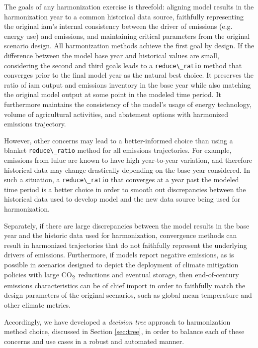 \documentclass[review]{elsarticle}
\newcommand{\code}[1]{\lstinline[basicstyle=\ttfamily\color{black}]|#1|}
\newcommand{\cotwo}{CO\textsubscript{2}~}
\begin{document}
The goals of any harmonization exercise is threefold: aligning model results in
the harmonization year to a common historical data source, faithfully
representing the original \gls{iam}’s internal consistency between the driver
of emissions (e.g. energy use) and emissions, and maintaining critical
parameters from the original scenario design. All harmonization methods achieve
the first goal by design. If the difference between the model base year and
historical values are small, considering the second and third goals leads to a
\code{reduce\_ratio} method that converges prior to the final model year as the
natural best choice. It preserves the ratio of \gls{iam} output and emissions
inventory in the base year while also matching the original model output at some
point in the modeled time period. It furthermore maintains the consistency of
the model's usage of energy technology, volume of agricultural activities, and
abatement options with harmonized emissions trajectory.

However, other concerns may lead to a better-informed choice than using a
blanket \code{reduce\_ratio} method for all emissions trajectories. For example,
emissions from \gls{luluc} are known to have high year-to-year variation, and
therefore historical data may change drastically depending on the base year
considered. In such a situation, a \code{reduce\_ratio} that converges at a year
past the modeled time period is a better choice in order to smooth out
discrepancies between the historical data used to develop model and the new data
source being used for harmonization.

Separately, if there are large discrepancies between the model results in the
base year and the historic data used for harmonization, convergence methods can
result in harmonized trajectories that do not faithfully represent the
underlying drivers of emissions. Furthermore, if models report negative
emissions, as is possible in scenarios designed to depict the deployment of
climate mitigation policies with large \cotwo reductions and eventual storage,
then end-of-century emissions characteristics can be of chief import in order to
faithfully match the design parameters of the original scenarios, such as global
mean temperature and other climate metrics.

Accordingly, we have developed a \textit{decision tree} approach to
harmonization method choice, discussed in Section \ref{sec:tree}, in order to
balance each of these concerns and use cases in a robust and automated manner.
\end{document}
